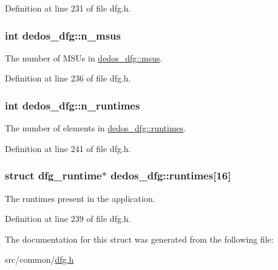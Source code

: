 Definition at line 231 of file dfg.\-h.

\hypertarget{structdedos__dfg_ad2f0a4385c8adcb46e74c872fdbed428}{
\subsubsection[{n\-\_\-msus}]{\setlength{\rightskip}{0pt plus 5cm}int dedos\-\_\-dfg\-::n\-\_\-msus}}\label{structdedos__dfg_ad2f0a4385c8adcb46e74c872fdbed428}


The number of M\-S\-Us in \hyperlink{structdedos__dfg_a5177dba1dea7f8f2fb383c5839c5f5f7}{dedos\-\_\-dfg\-::msus}. 



Definition at line 236 of file dfg.\-h.

\hypertarget{structdedos__dfg_ad222786891e1415cff70c46f083992df}{
\subsubsection[{n\-\_\-runtimes}]{\setlength{\rightskip}{0pt plus 5cm}int dedos\-\_\-dfg\-::n\-\_\-runtimes}}\label{structdedos__dfg_ad222786891e1415cff70c46f083992df}


The number of elements in \hyperlink{structdedos__dfg_a90ca69ed86b7f3d3286e4cdd4ddcae7f}{dedos\-\_\-dfg\-::runtimes}. 



Definition at line 241 of file dfg.\-h.

\hypertarget{structdedos__dfg_a90ca69ed86b7f3d3286e4cdd4ddcae7f}{
\subsubsection[{runtimes}]{\setlength{\rightskip}{0pt plus 5cm}struct {\bf dfg\-\_\-runtime}$\ast$ dedos\-\_\-dfg\-::runtimes\mbox{[}16\mbox{]}}}\label{structdedos__dfg_a90ca69ed86b7f3d3286e4cdd4ddcae7f}


The runtimes present in the application. 



Definition at line 239 of file dfg.\-h.



The documentation for this struct was generated from the following file\-:\begin{DoxyCompactItemize}
\item 
src/common/\hyperlink{dfg_8h}{dfg.\-h}\end{DoxyCompactItemize}
